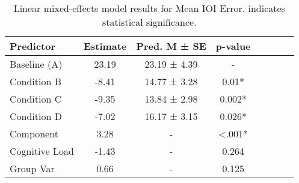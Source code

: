 
    \begin{table}[H]
    \centering
    \begin{small}
    \begin{tabular}{lccccccc}
\toprule
Predictor & Estimate & Pred. M ± SE & p-value \\
\midrule
Baseline (A) & 23.19 & 23.19 ± 4.39 & - \\
Condition B & -8.41 & 14.77 ± 3.28 & 0.01* \\
Condition C & -9.35 & 13.84 ± 2.98 & 0.002* \\
Condition D & -7.02 & 16.17 ± 3.15 & 0.026* \\
Component & 3.28 & - & <.001* \\
Cognitive Load & -1.43 & - & 0.264 \\
Group Var & 0.66 & - & 0.125 \\
\bottomrule
\end{tabular}

    \end{small}
    \caption[Linear mixed-effects model results for Mean IOI Error]{Linear mixed-effects model results for Mean IOI Error. \newline * indicates statistical significance.}
    \label{tab:meanioierror}

    \end{table}
